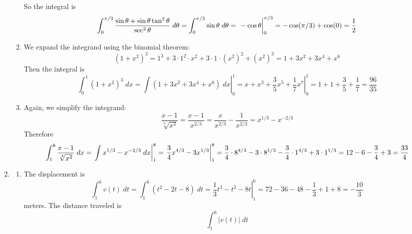 \documentclass{article}
\begin{document}
\begin{enumerate}
\begin{enumerate}
    So the integral is
    \begin{equation*}
      \int_0^{\pi/3} \frac{\sin\theta +
        \sin\theta\tan^2\theta}{\sec^2\theta} \; d\theta
      = \int_0^{\pi/3} \sin \theta \; d\theta
      = \left. \vphantom{\int} -\cos\theta \right|_0^{\pi/3}
      = -\cos(\pi/3) + \cos(0)
      = \frac{1}{2}
    \end{equation*}
  \item We expand the integrand using the binomial theorem:
    \begin{equation*}
      (1+x^2)^3 = 1^3 + 3\cdot 1^2 \cdot x^2 + 3 \cdot 1 \cdot
      (x^2)^2 + (x^2)^3 = 1 + 3x^2 + 3x^4 + x^6
    \end{equation*}
    Then the integral is
    \begin{equation*}
      \int_0^1 (1+x^2)^3 \; dx
      = \left. \int (1 + 3x^2 + 3x^4 + x^6) \; dx \right|_0^1
      = \left. x + x^3 + \frac{3}{5} x^5 + \frac{1}{7} x^7
      \right|_0^1
      = 1 + 1 + \frac{3}{5} + \frac{1}{7}
      = \frac{96}{35}
    \end{equation*}
  \item Again, we simplify the integrand:
    \begin{equation*}
      \frac{x-1}{\sqrt[3]{x^2}} = \frac{x-1}{x^{2/3}} =
      \frac{x}{x^{2/3}} - \frac{1}{x^{2/3}} = x^{1/3} - x^{-2/3}
    \end{equation*}
    Therefore
    \begin{equation*}
      \int_1^8 \frac{x-1}{\sqrt[3]{x^2}} \; dx
      = \left. \int x^{1/3} - x^{-2/3} \; dx \right|_1^8
      = \left. \vphantom{\int} \frac{3}{4} x^{4/3} - 3 x^{1/3}
      \right|_1^8
      = \frac{3}{4} \cdot 8^{4/3} - 3 \cdot 8^{1/3} - \frac{3}{4} \cdot
      1^{4/3} + 3 \cdot 1^{1/3}
      = 12 - 6 - \frac{3}{4} + 3 = \frac{33}{4}
    \end{equation*}
  \end{enumerate}
\item
  \begin{enumerate}
  \item The displacement is
    \begin{equation*}
      \int_1^6 v(t) \; dt = \int_1^6 (t^2 - 2t - 8) \; dt
      = \left. \frac{1}{3} t^3 - t^2 - 8t \right|_1^6
      = 72 - 36 - 48 - \frac{1}{3} + 1 + 8
      = -\frac{10}{3}
    \end{equation*}
    meters.  The distance traveled is
    \begin{equation*}
      \int_1^6 |v(t)| \; dt
    \end{equation*}

\end{enumerate}
\end{enumerate}
\end{document}
